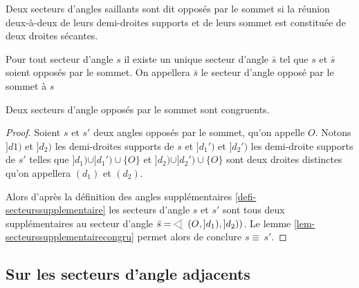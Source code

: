 \begin{defi}
    Deux secteurs d'angles saillants sont dit opposés par le sommet si la réunion deux-à-deux de leurs demi-droites supports et de leurs sommet est constituée de deux droites sécantes.
\end{defi}
\begin{prop}\label{prop-existetuniqueopposesommet}
    Pour tout secteur d'angle $s$ il existe un unique secteur d'angle $\bar{s}$ tel que $s$ et $\bar{s}$ soient opposés par le sommet. On appellera $\bar{s}$ le secteur d'angle opposé par le sommet à $s$
\end{prop}
\begin{cor}\label{cor-anglesometcongru}
    Deux secteurs d'angle opposés par le sommet sont congruents.
\begin{proof}
    Soient $s$ et $s'$ deux angles opposés par le sommet, qu'on appelle $O$. Notons $]d1)$ et $]d_2)$ les demi-droites supports de $s$ et $]d_1')$ et $]d_2')$ les demi-droite supports de $s'$ telles que $]d_1)\cup ]d_1') \cup \{O\}$ et $]d_2)\cup ]d_2') \cup \{O\}$ sont deux droites distinctes qu'on appellera $(d_1)$ et $(d_2)$. 
    
    Alors d'après la définition des angles supplémentaires \ref{defi-secteurssupplementaire} les secteurs d'angle $s$ et $s'$ sont tous deux supplémentaires au secteur d'angle $\bar{s} = \anglesaillant\left(O,]d_1),]d_2)\right)$. Le lemme \ref{lem-secteurssupplementairecongru} permet alors de conclure $s\equiv \,s'$.
\end{proof}
\end{cor}

    \subsection{Sur les secteurs d'angle adjacents}

